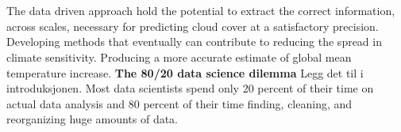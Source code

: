 \\ \\
The data driven approach hold the potential to extract the correct information, across scales, necessary for predicting cloud cover at a satisfactory precision. Developing methods that eventually can contribute to reducing the spread in climate sensitivity. Producing a more accurate estimate of global mean temperature increase.
\textbf{The 80/20 data science dilemma} Legg det til i introduksjonen. Most data scientists spend only 20 percent of their time on actual data analysis and 80 percent of their time finding, cleaning, and reorganizing huge amounts of data.

